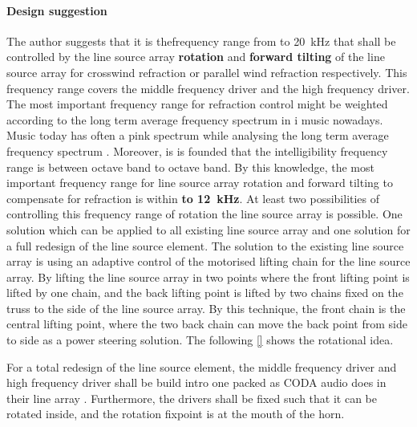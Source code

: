 \paragraph{Design suggestion} 
The author suggests that it is thefrequency range from  to \SI{20}{\kilo\hertz}  that shall be controlled by the line source array \textbf{rotation} and \textbf{forward tilting} of the line source array for crosswind refraction or parallel wind refraction respectively. This frequency range covers the middle frequency driver and the high frequency driver. The most important frequency range for refraction control might be weighted according to the long term average frequency spectrum in i music nowadays. Music today has often a pink spectrum while analysing the long term average frequency spectrum \citep{elowsson2017long}. Moreover, is is founded that the intelligibility frequency range is between  octave band to  octave band. By this knowledge, the most important frequency range for line source array rotation and forward tilting to compensate for refraction is within \textbf{ to \SI{12}{\kilo\hertz}}. At least two possibilities of controlling this frequency range of rotation the line source array is possible. One solution which can be applied to all existing line source array and one solution for a full redesign of the line source element. The solution to the existing line source array is using an adaptive control of the motorised lifting chain for the line source array. By lifting the line source array in two points where the front lifting point is lifted by one chain, and the back lifting point is lifted by two chains fixed on the truss to the side of the line source array. By this technique, the front chain is the central lifting point, where the two back chain can move the back point from side to side as a power steering solution. The following \autoref{} shows the rotational idea.



 For a total redesign of the line source element, the middle frequency driver and high frequency driver shall be build intro one packed as CODA audio does in their line array \citep{coda_ddp}. Furthermore, the drivers shall be fixed such that it can be rotated inside, and the rotation fixpoint is at the mouth of the horn.   

